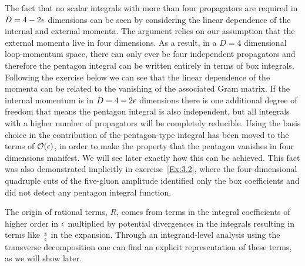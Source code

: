 The fact that no scalar integrals with more than four propagators are required
in $D=4-2\epsilon$ dimensions can be seen by considering the linear dependence of
the internal and external momenta.  The argument relies on our assumption that
the external momenta live in four dimensions. As a result, in a $D=4$
dimensional loop-momentum space, there can only ever be four independent
propagators and therefore the pentagon integral can be written entirely in
terms of box integrals. Following the exercise below we can see that the linear
dependence of the momenta can be related to the vanishing of the associated
Gram matrix. If the internal momentum is in $D=4-2\epsilon$ dimensions there is one
additional degree of freedom that means the pentagon integral is also
independent, but all integrals with a higher number of propagators will be
completely reducible. Using the basis choice in  the
contribution of the pentagon-type integral has been moved to the terms of
$\mathcal{O}(\epsilon)$, in order to make the property that the pentagon vanishes
in four dimensions manifest. We will see later exactly how this can be
achieved. This fact was also demonstrated implicitly in exercise~\ref{Ex:3.2}, where the four-dimensional quadruple cuts of the five-gluon amplitude identified only the box
coefficients and did not detect any pentagon integral function.

The origin of rational terms, $R$, comes from terms in the integral
coefficients of higher order in $\epsilon$ multiplied by potential divergences in the
integrals resulting in terms like $\tfrac{\epsilon}{\epsilon}$ in the expansion.
Through an integrand-level analysis using the transverse decomposition one can
find an explicit representation of these terms, as we will show later.

